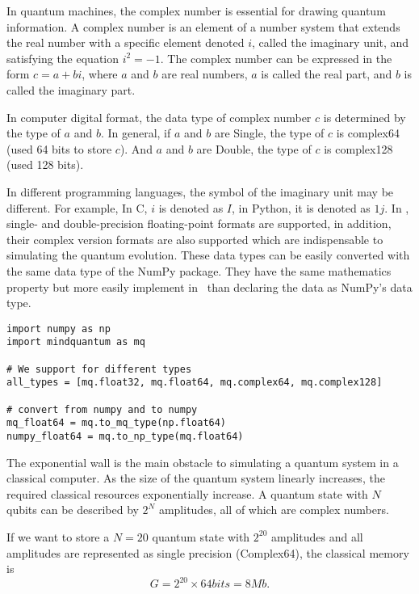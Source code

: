 In quantum machines, the complex number is essential for drawing quantum information. A complex number is an element of a number system that extends the real number with a specific element denoted $i$, called the imaginary unit, and satisfying the equation $i^2=-1$.
The complex number can be expressed in the form $c=a+bi$, where $a$ and $b$ are real numbers, $a$ is called the real part, and $b$ is called the imaginary part.

In computer digital format, the data type of complex number $c$ is determined by the type of $a$ and $b$.
In general, if $a$ and $b$ are Single, the type of $c$ is complex64 (used 64 bits to store $c$). And $a$ and $b$ are Double, the type of $c$ is complex128 (used 128 bits).

In different programming languages, the symbol of the imaginary unit may be different.
For example, In C, $i$ is denoted as $I$, in Python, it is denoted as $1j$.
In \MindQuantum, single- and double-precision floating-point formats are supported, in addition, their complex version formats are also supported which are indispensable to simulating the quantum evolution.
These data types can be easily converted with the same data type of the NumPy\cite{harris2020array} package. They have the same mathematics property but more easily implement in \MindQuantum\ than declaring the data as NumPy's data type.

\begin{lstlisting}
import numpy as np
import mindquantum as mq

# We support for different types
all_types = [mq.float32, mq.float64, mq.complex64, mq.complex128]

# convert from numpy and to numpy
mq_float64 = mq.to_mq_type(np.float64)
numpy_float64 = mq.to_np_type(mq.float64)
\end{lstlisting}

The exponential wall is the main obstacle to simulating a quantum system in a classical computer.
As the size of the quantum system linearly increases, the required classical resources exponentially increase.
A quantum state with $N$ qubits can be described by $2^N$ amplitudes, all of which are complex numbers.

If we want to store a $N=20$ quantum state with $2^{20}$ amplitudes and all amplitudes are represented as single precision (Complex64), the classical memory is
\begin{equation}
    G=2^{20}\times 64 bits = 8 Mb.
\end{equation}

